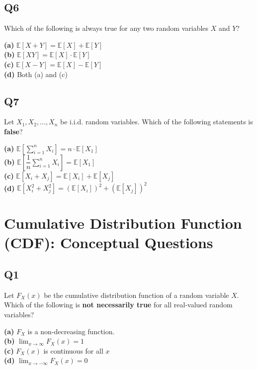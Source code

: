 
\subsection*{Q6}
Which of the following is always true for any two random variables $X$ and $Y$?

\textbf{(a)} $\mathbb{E}[X+Y] = \mathbb{E}[X] + \mathbb{E}[Y]$  \\
\textbf{(b)} $\mathbb{E}[XY] = \mathbb{E}[X] \cdot \mathbb{E}[Y]$  \\
\textbf{(c)} $\mathbb{E}[X-Y] = \mathbb{E}[X] - \mathbb{E}[Y]$  \\
\textbf{(d)} Both (a) and (c)

\subsection*{Q7}
Let $X_1, X_2, ..., X_n$ be i.i.d. random variables. Which of the following statements is \textbf{false}?

\textbf{(a)} $\mathbb{E}\left[\sum_{i=1}^n X_i\right] = n \cdot \mathbb{E}[X_1]$  \\
\textbf{(b)} $\mathbb{E}\left[\dfrac{1}{n} \sum_{i=1}^n X_i\right] = \mathbb{E}[X_1]$  \\
\textbf{(c)} $\mathbb{E}[X_i + X_j] = \mathbb{E}[X_i] + \mathbb{E}[X_j]$  \\
\textbf{(d)} $\mathbb{E}[X_i^2 + X_j^2] = (\mathbb{E}[X_i])^2 + (\mathbb{E}[X_j])^2$


\section{Cumulative Distribution Function (CDF): Conceptual Questions}

\subsection*{Q1}
Let $F_X(x)$ be the cumulative distribution function of a random variable $X$. Which of the following is \textbf{not necessarily true} for all real-valued random variables?

\textbf{(a)} $F_X$ is a non-decreasing function. \\
\textbf{(b)} $\lim_{x \to \infty} F_X(x) = 1$ \\
\textbf{(c)} $F_X(x)$ is continuous for all $x$ \\
\textbf{(d)} $\lim_{x \to -\infty} F_X(x) = 0$

